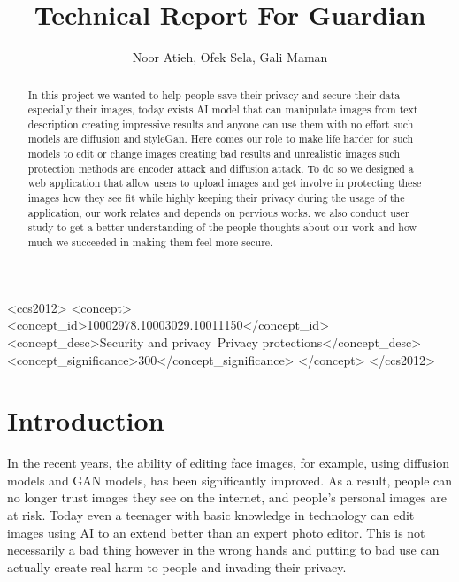 \documentclass[sigconf]{acmart}
\begin{document}
\title{Technical Report For Guardian} %
\author{Noor Atieh, Ofek Sela, Gali Maman}
\begin{abstract}
In this project we wanted to help people save their privacy and secure their data especially their images, today exists AI model that can manipulate images from text description creating impressive results and anyone can use them with no effort such models are diffusion and styleGan. Here comes our role to make life harder for such models to edit or change images creating bad results and unrealistic images such protection methods are encoder attack and diffusion attack. To do so we designed a web application that allow users to upload images and get involve in protecting these images how they see fit while highly keeping their privacy during the usage of the application, our work relates and depends on pervious works. we also conduct user study to get a better understanding of the people thoughts about our work and how much we succeeded in making them feel more secure.
\end{abstract}

\begin{CCSXML}
<ccs2012>
<concept>
<concept_id>10002978.10003029.10011150</concept_id>
<concept_desc>Security and privacy~Privacy protections</concept_desc>
<concept_significance>300</concept_significance>
</concept>
</ccs2012>
\end{CCSXML}



\maketitle

\section{Introduction}

In the recent years, the ability of editing face images, for example, using diffusion models and GAN models, has been significantly improved. As a result, people can no longer trust images they see on the internet, and people's personal images are at risk. Today even a teenager with basic knowledge in technology can edit images using AI to an extend better than an expert photo editor. This is not necessarily a bad thing however in the wrong hands and putting to bad use can actually create real harm to people and invading their privacy.  
\end{document}
